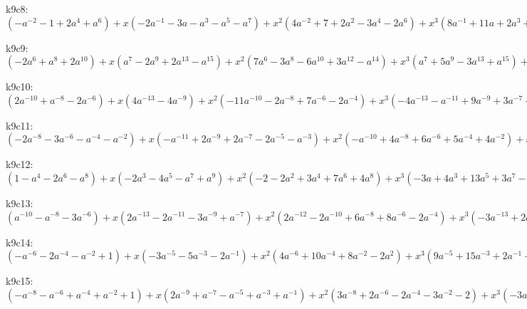 k9c8: $ (-a^{-2}-1+2a^{4}+a^{6}) +x(-2a^{-1}-3a-a^{3}-a^{5}-a^{7}) +x^{2}(4a^{-2}+7+2a^{2}-3a^{4}-2a^{6}) +x^{3}(8a^{-1}+11a+2a^{3}+a^{7}) +x^{4}(-4a^{-2}-6-4a^{2}+2a^{6}) +x^{5}(-8a^{-1}-13a-3a^{3}+2a^{5}) +x^{6}(a^{-2}-1+2a^{4}) +x^{7}(2a^{-1}+4a+2a^{3}) +x^{8}(1+a^{2}) $

k9c9: $ (-2a^{6}+a^{8}+2a^{10}) +x(a^{7}-2a^{9}+2a^{13}-a^{15}) +x^{2}(7a^{6}-3a^{8}-6a^{10}+3a^{12}-a^{14}) +x^{3}(a^{7}+5a^{9}-3a^{13}+a^{15}) +x^{4}(-5a^{6}+3a^{8}+2a^{10}-4a^{12}+2a^{14}) +x^{5}(-3a^{7}-8a^{9}-2a^{11}+3a^{13}) +x^{6}(a^{6}-3a^{8}-a^{10}+3a^{12}) +x^{7}(a^{7}+3a^{9}+2a^{11}) +x^{8}(a^{8}+a^{10}) $

k9c10: $ (2a^{-10}+a^{-8}-2a^{-6}) +x(4a^{-13}-4a^{-9}) +x^{2}(-11a^{-10}-2a^{-8}+7a^{-6}-2a^{-4}) +x^{3}(-4a^{-13}-a^{-11}+9a^{-9}+3a^{-7}-3a^{-5}) +x^{4}(-2a^{-12}+9a^{-10}+3a^{-8}-7a^{-6}+a^{-4}) +x^{5}(a^{-13}-a^{-11}-7a^{-9}-3a^{-7}+2a^{-5}) +x^{6}(a^{-12}-3a^{-10}-a^{-8}+3a^{-6}) +x^{7}(a^{-11}+3a^{-9}+2a^{-7}) +x^{8}(a^{-10}+a^{-8}) $

k9c11: $ (-2a^{-8}-3a^{-6}-a^{-4}-a^{-2}) +x(-a^{-11}+2a^{-9}+2a^{-7}-2a^{-5}-a^{-3}) +x^{2}(-a^{-10}+4a^{-8}+6a^{-6}+5a^{-4}+4a^{-2}) +x^{3}(a^{-11}-3a^{-9}-3a^{-7}+9a^{-5}+8a^{-3}) +x^{4}(2a^{-10}-4a^{-8}-7a^{-6}-5a^{-4}-4a^{-2}) +x^{5}(3a^{-9}-a^{-7}-12a^{-5}-8a^{-3}) +x^{6}(3a^{-8}+a^{-6}-a^{-4}+a^{-2}) +x^{7}(2a^{-7}+4a^{-5}+2a^{-3}) +x^{8}(a^{-6}+a^{-4}) $

k9c12: $ (1-a^{4}-2a^{6}-a^{8}) +x(-2a^{3}-4a^{5}-a^{7}+a^{9}) +x^{2}(-2-2a^{2}+3a^{4}+7a^{6}+4a^{8}) +x^{3}(-3a+4a^{3}+13a^{5}+3a^{7}-3a^{9}) +x^{4}(1-a^{2}-a^{4}-5a^{6}-6a^{8}) +x^{5}(2a-3a^{3}-11a^{5}-5a^{7}+a^{9}) +x^{6}(2a^{2}+2a^{8}) +x^{7}(2a^{3}+4a^{5}+2a^{7}) +x^{8}(a^{4}+a^{6}) $

k9c13: $ (a^{-10}-a^{-8}-3a^{-6}) +x(2a^{-13}-2a^{-11}-3a^{-9}+a^{-7}) +x^{2}(2a^{-12}-2a^{-10}+6a^{-8}+8a^{-6}-2a^{-4}) +x^{3}(-3a^{-13}+2a^{-11}+9a^{-9}+a^{-7}-3a^{-5}) +x^{4}(-5a^{-12}-a^{-10}-4a^{-8}-7a^{-6}+a^{-4}) +x^{5}(a^{-13}-4a^{-11}-9a^{-9}-2a^{-7}+2a^{-5}) +x^{6}(2a^{-12}+a^{-8}+3a^{-6}) +x^{7}(2a^{-11}+4a^{-9}+2a^{-7}) +x^{8}(a^{-10}+a^{-8}) $

k9c14: $ (-a^{-6}-2a^{-4}-a^{-2}+1) +x(-3a^{-5}-5a^{-3}-2a^{-1}) +x^{2}(4a^{-6}+10a^{-4}+8a^{-2}-2a^{2}) +x^{3}(9a^{-5}+15a^{-3}+2a^{-1}-3a+a^{3}) +x^{4}(-4a^{-6}-9a^{-4}-12a^{-2}-4+3a^{2}) +x^{5}(-8a^{-5}-16a^{-3}-4a^{-1}+4a) +x^{6}(a^{-6}+3a^{-2}+4) +x^{7}(2a^{-5}+5a^{-3}+3a^{-1}) +x^{8}(a^{-4}+a^{-2}) $

k9c15: $ (-a^{-8}-a^{-6}+a^{-4}+a^{-2}+1) +x(2a^{-9}+a^{-7}-a^{-5}+a^{-3}+a^{-1}) +x^{2}(3a^{-8}+2a^{-6}-2a^{-4}-3a^{-2}-2) +x^{3}(-3a^{-9}-a^{-7}+5a^{-5}-3a^{-1}) +x^{4}(-5a^{-8}-4a^{-6}+1) +x^{5}(a^{-9}-3a^{-7}-7a^{-5}-a^{-3}+2a^{-1}) +x^{6}(2a^{-8}+a^{-6}+a^{-4}+2a^{-2}) +x^{7}(2a^{-7}+4a^{-5}+2a^{-3}) +x^{8}(a^{-6}+a^{-4}) $

